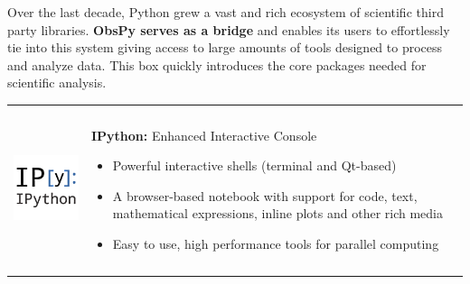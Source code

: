 \small
Over the last decade, Python grew a vast and rich ecosystem of scientific third
party libraries. \textbf{ObsPy serves as a bridge} and enables its users to
effortlessly tie into this system giving access to large amounts of tools
designed to process and analyze data. This box quickly introduces the core
packages needed for scientific analysis.

\vspace{1ex}
\noindent\hrulefill
\vspace{1ex}

    \begin{center}
    \begin{tabularx}{\textwidth}{rX}
        \begin{minipage}{0.25\columnwidth}
            \begin{center}
            \includegraphics[height=4cm]{./images/ipython.png}
            \end{center}
        \end{minipage}
        &
        \begin{minipage}{0.7\columnwidth}
            \textbf{IPython:} Enhanced Interactive Console
            \vspace{0.5ex}
            \footnotesize{
                \begin{itemize}
                    \item Powerful interactive shells (terminal and Qt-based)
                    \item A browser-based notebook with support for code, text, mathematical expressions, inline plots and other rich media
                    \item Easy to use, high performance tools for parallel computing
                \end{itemize}
            }

        \end{minipage}
    \end{tabularx}
    \end{center}

\vspace{1ex}
\noindent\hrulefill
\vspace{1ex}

